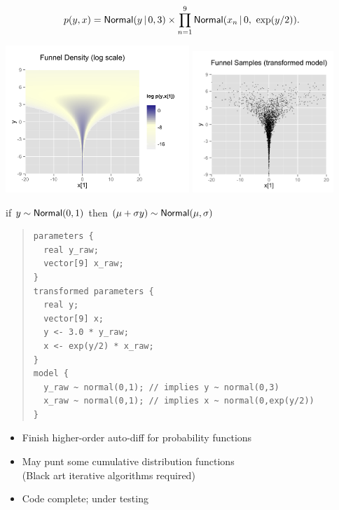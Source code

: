 \documentclass[10pt]{report}
\begin{document}
\vspace*{-8pt}
\[
p(y,x) = \text{\sf Normal}(y \, | \, 0,3) \times \prod_{n=1}^9
\text{\sf Normal}(x_n \, | \, 0,\ \exp(y/2)).
\]
\begin{center}
\includegraphics[width=0.52\textwidth]{img/funnel.png}
\includegraphics[width=0.4\textwidth]{img/funnel-fit.png}
\end{center}

\begin{subitemize}
\item
if $y \sim \text{\sf Normal}(0,1)$ then
$(\mu + \sigma y) \sim \text{\sf Normal}(\mu,\sigma)$
\end{subitemize}
\begin{quote}
{\footnotesize
\begin{Verbatim}
parameters {  
  real y_raw;
  vector[9] x_raw;
}
transformed parameters {
  real y;
  vector[9] x;
  y <- 3.0 * y_raw;  
  x <- exp(y/2) * x_raw;
}
model {
  y_raw ~ normal(0,1); // implies y ~ normal(0,3) 
  x_raw ~ normal(0,1); // implies x ~ normal(0,exp(y/2))  
}
\end{Verbatim}
}
\end{quote}



\begin{itemize}
\item Finish higher-order auto-diff for probability functions
\item May punt some cumulative distribution functions
  \\
  {\footnotesize (Black art iterative algorithms required)}
  \vfill
\item Code complete; under testing
\end{itemize}
\end{document}
